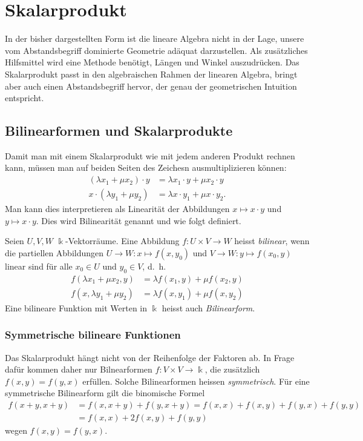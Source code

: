 %
%
%
\section{Skalarprodukt
\label{buch:section:skalarprodukt}}
In der bisher dargestellten Form ist die lineare Algebra nicht
in der Lage, unsere vom Abstandsbegriff dominierte Geometrie adäquat
darzustellen.
Als zusätzliches Hilfsmittel wird eine Methode benötigt, Längen
und Winkel auszudrücken.
Das Skalarprodukt passt in den algebraischen Rahmen der
linearen Algebra, bringt aber auch einen Abstandsbegriff hervor,
der genau der geometrischen Intuition entspricht.

\subsection{Bilinearformen und Skalarprodukte
\label{buch:subsection:bilinearformen}}
Damit man mit einem Skalarprodukt wie mit jedem anderen Produkt
rechnen kann, müssen man auf beiden Seiten des Zeichesn ausmultiplizieren
können:
\begin{align*}
(\lambda x_1 + \mu x_2)\cdot y &= \lambda x_1\cdot y + \mu x_2\cdot y\\
x\cdot (\lambda y_1 + \mu y_2) &= \lambda x\cdot y_1 + \mu x\cdot y_2.
\end{align*}
Man kann dies interpretieren als Linearität der Abbildungen 
$x\mapsto x\cdot y$ und $y\mapsto x\cdot y$.
Dies wird Bilinearität genannt und wie folgt definiert.

\begin{definition}
Seien $U,V,W$ $\Bbbk$-Vektorräume.
Eine Abbildung $f\colon U\times V\to W$  heisst {\em bilinear},
%
wenn die partiellen Abbildungen $U\to W:x\mapsto f(x,y_0)$ und
$V\to W:y\mapsto f(x_0,y)$
linear sind für alle $x_0\in U$ und $y_0\in V$, d.~h.
\begin{align*}
f(\lambda x_1 + \mu x_2,y) &= \lambda f(x_1,y) + \mu f(x_2,y)
\\
f(x,\lambda y_1 + \mu y_2) &= \lambda f(x,y_1) + \mu f(x,y_2)
\end{align*}
Eine bilineare Funktion mit Werten in $\Bbbk$ heisst auch {\em Bilinearform}.
%
\end{definition}

\subsubsection{Symmetrische bilineare Funktionen}
Das Skalarprodukt hängt nicht von der Reihenfolge der Faktoren ab.
In Frage dafür kommen daher nur Bilnearformen $f\colon V\times V\to\Bbbk$,
die zusätzlich $f(x,y)=f(y,x)$ erfüllen.
Solche Bilinearformen heissen {\em symmetrisch}.
Für eine symmetrische Bilinearform gilt die binomische Formel
\begin{align*}
f(x+y,x+y)
&=
f(x,x+y)+f(y,x+y)
=
f(x,x)+f(x,y)+f(y,x)+f(y,y)
\\
&=
f(x,x)+2f(x,y)+f(y,y)
\end{align*}
wegen $f(x,y)=f(y,x)$.

